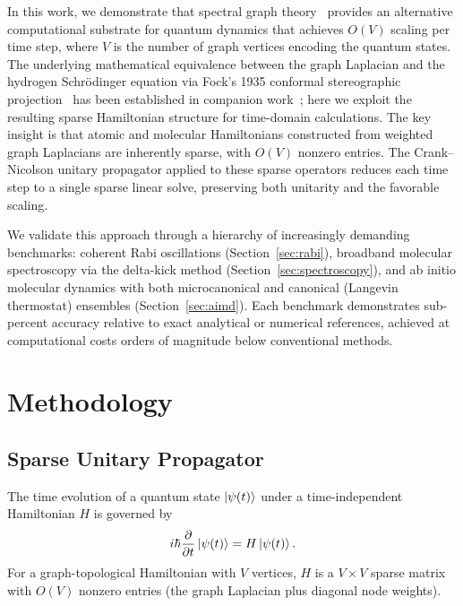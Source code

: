 \documentclass[aps,pra,twocolumn,superscriptaddress,longbibliography,floatfix]{revtex4-2}
\begin{document}
In this work, we demonstrate that spectral graph theory~\cite{Chung1997}
provides an alternative computational substrate for quantum dynamics that
achieves $O(V)$ scaling per time step, where $V$ is the number of graph
vertices encoding the quantum states. The underlying mathematical
equivalence between the graph Laplacian and the hydrogen Schr\"odinger
equation via Fock's 1935 conformal stereographic projection~\cite{Fock1935}
has been established in companion work~\cite{GeoVacPaper7}; here we exploit
the resulting sparse Hamiltonian structure for time-domain calculations. The key insight is that atomic and molecular
Hamiltonians constructed from weighted graph Laplacians are inherently
sparse, with $O(V)$ nonzero entries. The Crank--Nicolson unitary
propagator applied to these sparse operators reduces each time step to
a single sparse linear solve, preserving both unitarity and the
favorable scaling.

We validate this approach through a hierarchy of increasingly demanding
benchmarks: coherent Rabi oscillations (Section~\ref{sec:rabi}),
broadband molecular spectroscopy via the delta-kick method
(Section~\ref{sec:spectroscopy}), and ab initio molecular dynamics
with both microcanonical and canonical (Langevin thermostat) ensembles
(Section~\ref{sec:aimd}). Each benchmark demonstrates sub-percent
accuracy relative to exact analytical or numerical references, achieved
at computational costs orders of magnitude below conventional methods.

\section{Methodology}
\label{sec:methodology}

\subsection{Sparse Unitary Propagator}
\label{sec:propagator}

The time evolution of a quantum state $\ket{\psi(t)}$ under a
time-independent Hamiltonian $H$ is governed by
\begin{equation}
  i\hbar \frac{\partial}{\partial t}\ket{\psi(t)} = H\ket{\psi(t)}.
\end{equation}
For a graph-topological Hamiltonian with $V$ vertices, $H$ is a
$V \times V$ sparse matrix with $O(V)$ nonzero entries (the graph
Laplacian plus diagonal node weights).
\end{document}
